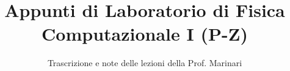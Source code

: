 \documentclass[a4paper,12pt]{article}
\title{Appunti di Laboratorio di Fisica Computazionale I (P-Z)}
\author{Trascrizione e note delle lezioni della Prof. Marinari}
\date{}
\begin{document}
\maketitle
\projectintro
\tableofcontents
\newpage

\end{document}
